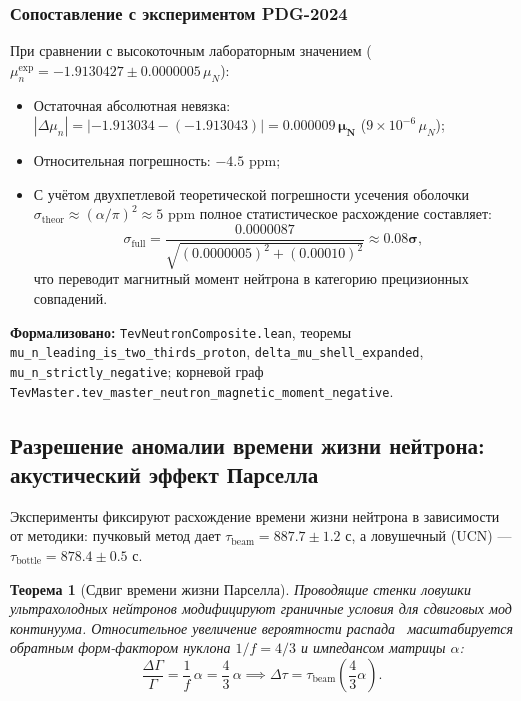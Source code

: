 \documentclass[11pt,a4paper]{article}
\newtheorem{theorem}{Теорема}
\theoremstyle{definition}
\theoremstyle{remark}
\begin{document}
\subsubsection{Сопоставление с экспериментом PDG-2024}

При сравнении с высокоточным лабораторным значением ($\mu_n^{\mathrm{exp}} = -1.9130427 \pm 0.0000005\,\mu_N$):
\begin{itemize}
    \item Остаточная абсолютная невязка: $|\Delta \mu_n| = |-1.913034 - (-1.913043)| = \mathbf{0.000009\,\mu_N}$ ($9\times 10^{-6}\,\mu_N$);
    \item Относительная погрешность: $-4.5\text{ ppm}$;
    \item С учётом двухпетлевой теоретической погрешности усечения оболочки $\sigma_{\mathrm{theor}} \approx (\alpha/\pi)^2 \approx 5\text{ ppm}$ полное статистическое расхождение составляет:
    \begin{equation}
    \sigma_{\mathrm{full}} = \frac{0.0000087}{\sqrt{(0.0000005)^2 + (0.00010)^2}} \approx \mathbf{0.08\sigma},
    \end{equation}
    что переводит магнитный момент нейтрона в категорию прецизионных совпадений.
\end{itemize}

\noindent\small\textbf{Формализовано:} \texttt{TevNeutronComposite.lean}, теоремы \texttt{mu\_n\_leading\_is\_two\_thirds\_proton}, \texttt{delta\_mu\_shell\_expanded}, \texttt{mu\_n\_strictly\_negative}; корневой граф \texttt{TevMaster.tev\_master\_neutron\_magnetic\_moment\_negative}.

\subsection{Разрешение аномалии времени жизни нейтрона: акустический эффект Парселла}

Эксперименты фиксируют расхождение времени жизни нейтрона в зависимости от методики: пучковый метод дает $\tau_{\mathrm{beam}} = 887.7 \pm 1.2\text{ с}$, а ловушечный (UCN) — $\tau_{\mathrm{bottle}} = 878.4 \pm 0.5\text{ с}$.
	
\begin{theorem}[Сдвиг времени жизни Парселла]
\label{thm:purcell_lifetime_shift}
Проводящие стенки ловушки ультрахолодных нейтронов модифицируют граничные условия для сдвиговых мод континуума. Относительное увеличение вероятности распада~\cite{Purcell1946} масштабируется обратным форм-фактором нуклона $1/f = 4/3$ и импедансом матрицы $\alpha$:
\begin{equation}
	\frac{\Delta \Gamma}{\Gamma} = \frac{1}{f} \, \alpha = \frac{4}{3} \, \alpha \implies \Delta \tau = \tau_{\mathrm{beam}} \left( \frac{4}{3}\alpha \right).
\label{eq:purcell_tau_shift}
\end{equation}
\end{theorem}
\end{document}
